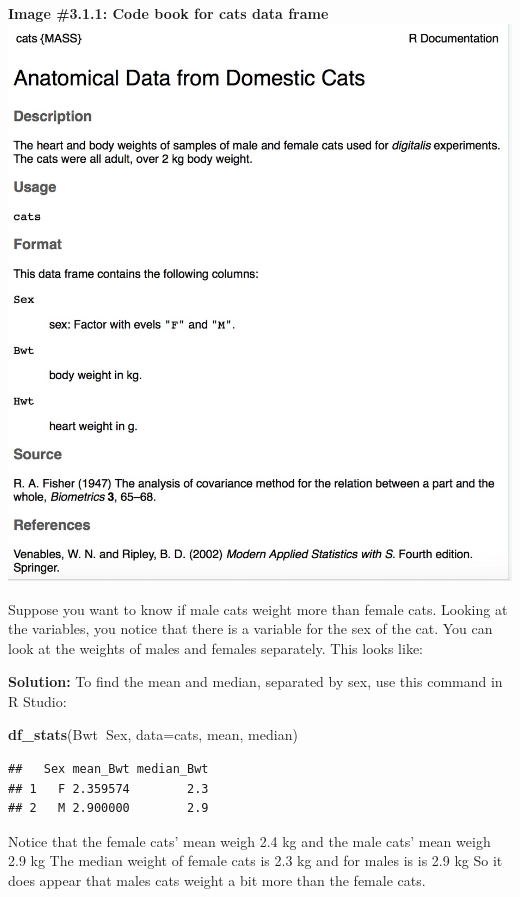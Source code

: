 \documentclass[]{book}
\newenvironment{Shaded}{\begin{snugshade}}{\end{snugshade}}
\newcommand{\DataTypeTok}[1]{\textcolor[rgb]{0.13,0.29,0.53}{#1}}
\newcommand{\KeywordTok}[1]{\textcolor[rgb]{0.13,0.29,0.53}{\textbf{#1}}}
\newcommand{\NormalTok}[1]{#1}
\newcommand{\OperatorTok}[1]{\textcolor[rgb]{0.81,0.36,0.00}{\textbf{#1}}}
\begin{document}
\textbf{Image \#3.1.1: Code book for cats data frame}
\includegraphics{code_book_cats.jpeg}

Suppose you want to know if male cats weight more than female cats. Looking at the variables, you notice that there is a variable for the sex of the cat. You can look at the weights of males and females separately. This looks like:

\textbf{Solution:}
To find the mean and median, separated by sex, use this command in R Studio:

\begin{Shaded}
\begin{Highlighting}[]
\KeywordTok{df_stats}\NormalTok{(Bwt}\OperatorTok{~}\NormalTok{Sex, }\DataTypeTok{data=}\NormalTok{cats, mean, median)}
\end{Highlighting}
\end{Shaded}

\begin{verbatim}
##   Sex mean_Bwt median_Bwt
## 1   F 2.359574        2.3
## 2   M 2.900000        2.9
\end{verbatim}

Notice that the female cats' mean weigh 2.4 kg and the male cats' mean weigh 2.9 kg The median weight of female cats is 2.3 kg and for males is is 2.9 kg So it does appear that males cats weight a bit more than the female cats.
\end{document}
